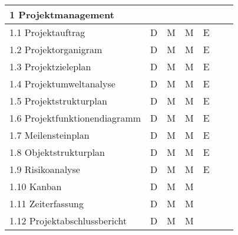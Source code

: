 \begin{longtable}{|l|c|c|c|c|c|c|}
  \multicolumn{7}{|l|}{1 Projektmanagement}                                                                                     \\ \hline
  1.1 Projektauftrag                     & D              & M           & M          & E        &               &               \\ \hline
  1.2 Projektorganigram                  & D              & M           & M          & E        &               &               \\ \hline
  1.3 Projektzieleplan                   & D              & M           & M          & E        &               &               \\ \hline
  1.4 Projektumweltanalyse               & D              & M           & M          & E        &               &               \\ \hline
  1.5 Projektstrukturplan                & D              & M           & M          & E        &               &               \\ \hline
  1.6 Projektfunktionendiagramm          & D              & M           & M          & E        &               &               \\ \hline
  1.7 Meilensteinplan                    & D              & M           & M          & E        &               &               \\ \hline
  1.8 Objektstrukturplan                 & D              & M           & M          & E        &               &               \\ \hline
  1.9 Risikoanalyse                      & D              & M           & M          & E        &               &               \\ \hline
  1.10 Kanban                            & D              & M           & M          &          &               &               \\ \hline
  1.11 Zeiterfassung                     & D              & M           & M          &          &               &               \\ \hline
  1.12 Projektabschlussbericht           & D              & M           & M          &          &               &               \\ \hline


\end{longtable}
